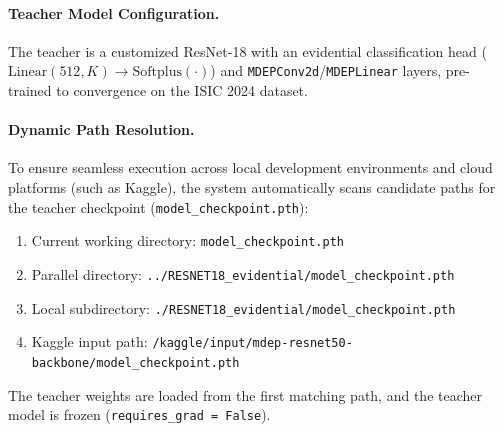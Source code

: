 \documentclass[letterpaper]{article} %
\newcommand{\softplus}{\text{Softplus}}
\begin{document}
\paragraph{Teacher Model Configuration.}
The teacher is a customized ResNet-18 with an evidential classification head ($\text{Linear}(512, K) \to \softplus(\cdot)$) and \texttt{MDEPConv2d}/\texttt{MDEPLinear} layers, pre-trained to convergence on the ISIC 2024 dataset.

\paragraph{Dynamic Path Resolution.}
To ensure seamless execution across local development environments and cloud platforms (such as Kaggle), the system automatically scans candidate paths for the teacher checkpoint (\texttt{model\_checkpoint.pth}):
\begin{enumerate}
    \item Current working directory: \texttt{model\_checkpoint.pth}
    \item Parallel directory: \texttt{../RESNET18\_evidential/model\_checkpoint.pth}
    \item Local subdirectory: \texttt{./RESNET18\_evidential/model\_checkpoint.pth}
    \item Kaggle input path: \texttt{/kaggle/input/mdep-resnet50-backbone/model\_checkpoint.pth}
\end{enumerate}
The teacher weights are loaded from the first matching path, and the teacher model is frozen (\texttt{requires\_grad = False}).
\end{document}
